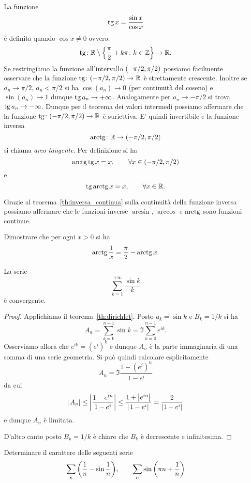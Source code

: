 La funzione
\[
\operatorname{tg} x = \frac{\sin x}{\cos x}
\]
è definita quando $\cos x\neq 0$ ovvero:
\[
  \operatorname{tg} \colon \mathbb R \setminus{\left\{ \frac \pi 2+ k\pi\colon k\in \mathbb Z\right\}} \to \mathbb R.
\]
Se restringiamo la funzione all'intervallo ${\left( -\pi/2, \pi/2 \right)}$ possiamo
facilmente osservare che la funzione $\operatorname{tg}\colon(-\pi/2,\pi/2)\to \mathbb R$ è strettamente crescente. Inoltre se $a_n \to \pi/2$, $a_n<\pi/2$ si ha $\cos(a_n)\to 0$ (per continuità del coseno) e $\sin(a_n)\to 1$ dunque $\operatorname{tg} a_n\to +\infty$. Analogamente per $a_n \to -\pi/2$ si trova $\operatorname{tg} a_n \to -\infty$. Dunque per il teorema dei valori intermedi possiamo affermare che la funzione $\operatorname{tg}\colon(-\pi/2,\pi/2)\to \mathbb R$ è suriettiva. E' quindi invertibile
e la funzione inversa
\[
 \operatorname{arctg} \colon \mathbb R \to (-\pi/2,\pi/2)
\]
si chiama \emph{arco tangente}. Per definizione si ha
\[
  \operatorname{arctg} \operatorname{tg} x = x, \qquad \forall x \in (-\pi/2, \pi/2)
\]
e
\[
 \operatorname{tg}\operatorname{arctg} x = x, \qquad \forall x \in \mathbb R.
\]

Grazie al teorema~\ref{th:inversa_continua} sulla continuità della
funzione inversa possiamo
affermare che
le funzioni inverse $\arcsin$, $\arccos$ e $\operatorname{arctg}$ sono funzioni continue.

\begin{exercise}
Dimostrare che per ogni $x>0$ si ha
\[
  \operatorname{arctg} \frac 1 x = \frac \pi 2 - \operatorname{arctg} x.
\]
\end{exercise}

\begin{exercise}
La serie
\[
 \sum_{k=1}^{+\infty} \frac{\sin k}{k}
\]
è convergente.
\end{exercise}
\begin{proof}
Applichiamo il teorema~\ref{th:dirichlet}.
Posto $a_k = \sin k$ e $B_k=1/k$
si ha
\[
  A_n = \sum_{k=0}^{n-1} \sin k = \Im \sum_{k=0}^{n-1} e^{ik}.
\]
Osserviamo allora che $e^{ik}=(e^i)^k$ e dunque $A_n$ è la parte immaginaria
di una somma di una serie geometria. Si può quindi calcolare esplicitamente
\[
  A_n = \Im \frac{1-(e^i)^n}{1-e^i}
\]
da cui
\[
 {\left|A_n\right|} \le {\left|\frac{1-e^{in}}{1-e^i}\right|} \le \frac{1+{\left|e^{in}\right|}}{{\left|1-e^i\right|}}
 = \frac{2}{{\left|1-e^i\right|}}
\]
e dunque $A_n$ è limitata.

D'altro canto posto $B_k = 1/k$ è chiaro che $B_k$ è
decrescente e infinitesima.
\end{proof}

\begin{exercise}
Determinare il carattere delle seguenti serie
\[
  \sum_n {\left( \frac 1 n - \sin \frac 1 n \right)},\qquad
  \sum_n \sin{\left( \pi n + \frac 1 n \right)}
\]
\end{exercise}

